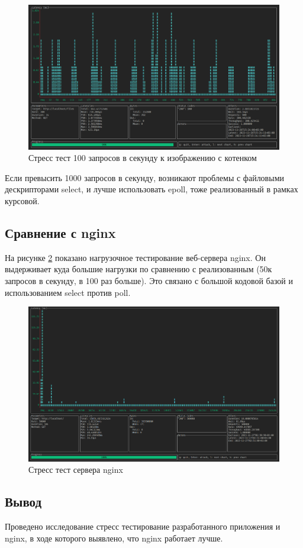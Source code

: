 \begin{figure}[H]
    \begin{center}
        \includegraphics[width=0.95\linewidth]{inc/img/100_files.png}
        \caption{Стресс тест 100 запросов в секунду к изображению с котенком}
        \label{img:s3}
    \end{center}
\end{figure}

Если превысить 1000 запросов в секунду, возникают проблемы с файловыми дескрипторами select, и лучше использовать epoll, тоже реализованный в рамках курсовой.


\subsection{Сравнение с nginx}

На рисунке \ref{img:nginx} показано нагрузочное тестирование веб-сервера nginx. Он выдерживает куда большие нагрузки по сравнению с реализованным (50к запросов в секунду, в 100 раз больше). Это связано с большой кодовой базой и использованием select против poll.

\begin{figure}[H]
    \begin{center}
        \includegraphics[width=0.95\linewidth]{inc/img/nginx.png}
        \caption{Стресс тест сервера nginx}
        \label{img:nginx}
    \end{center}
\end{figure}


\subsection{Вывод}
Проведено исследование стресс тестирование разработанного приложения и nginx, в ходе которого выявлено, что nginx работает лучше.